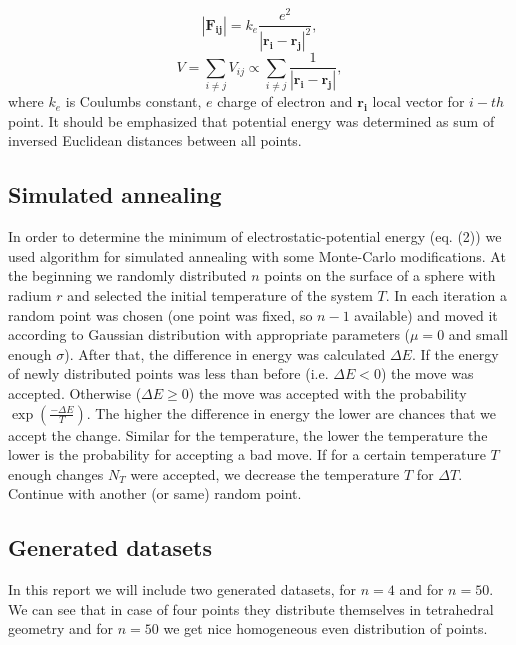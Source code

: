 \documentclass[a4paper, 12pt]{article}
\newcommand{\vect}[1]{\boldsymbol{#1}}
\begin{document}
\begin{equation}
	|\vect{F_{ij}}| = k_e \frac{e^2}{|\vect{r_i}-\vect{r_j}|^2},
\end{equation}
\begin{equation}
	V = \sum_{i\neq j}V_{ij} \propto \sum_{i\neq j}\frac{1}{|\vect{r_i} - \vect{r_j}|},
\end{equation}
where $k_e$ is Coulumbs constant, $e$ charge of electron and $\vect{r_i}$ local vector for $i-th$ point. It should be emphasized that potential energy was determined as sum of inversed Euclidean distances between all points. 

\subsection{Simulated annealing}
In order to determine the minimum of electrostatic-potential energy (eq. (2)) we used algorithm for simulated annealing with some Monte-Carlo modifications. At the beginning we randomly distributed $n$ points on the surface of a sphere with radium $r$ and selected the initial temperature of the system $T$. In each iteration a random point was chosen (one point was fixed, so $n-1$ available) and moved it according to Gaussian distribution with appropriate parameters ($\mu = 0$ and small enough $\sigma$). After that, the difference in energy was calculated $\Delta E$. If the energy of newly distributed points was less than before (i.e. $\Delta E < 0$) the move was accepted. Otherwise ($\Delta E \geq 0$) the move was accepted with the probability $\exp(\frac{-\Delta E}{T})$. The higher the difference in energy the lower are chances that we accept the change. Similar for the temperature, the lower the temperature the lower is the probability for accepting a bad move. If for a certain temperature $T$ enough changes $N_T$ were accepted, we decrease the temperature $T$ for $\Delta T$. Continue with another (or same) random point.   

\subsection{Generated datasets}

In this report we will include two generated datasets, for $n = 4$ and for $n = 50$. We can see that in case of four points they distribute themselves in tetrahedral geometry and for $n = 50$ we get nice homogeneous even distribution of points.
\end{document}
